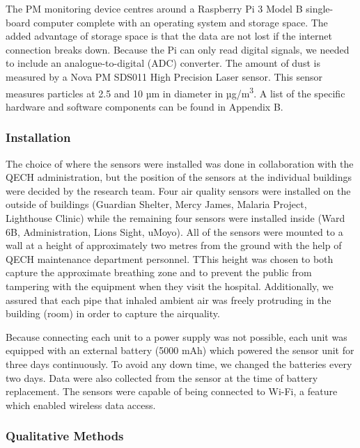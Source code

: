 \documentclass[
  authoryear,
  review,
  3p]{elsarticle}
\begin{document}
The PM monitoring device centres around a Raspberry Pi 3 Model B
single-board computer complete with an operating system and storage
space. The added advantage of storage space is that the data are not
lost if the internet connection breaks down. Because the Pi can only
read digital signals, we needed to include an analogue-to-digital (ADC)
converter. The amount of dust is measured by a Nova PM SDS011 High
Precision Laser sensor. This sensor measures particles at 2.5 and 10 µm
in diameter in µg/m\textsuperscript{3}. A list of the specific hardware
and software components can be found in Appendix B.

\hypertarget{installation}{%
\subsubsection{Installation}\label{installation}}

The choice of where the sensors were installed was done in collaboration
with the QECH administration, but the position of the sensors at the
individual buildings were decided by the research team. Four air quality
sensors were installed on the outside of buildings (Guardian Shelter,
Mercy James, Malaria Project, Lighthouse Clinic) while the remaining
four sensors were installed inside (Ward 6B, Administration, Lions
Sight, uMoyo). All of the sensors were mounted to a wall at a height of
approximately two metres from the ground with the help of QECH
maintenance department personnel. TThis height was chosen to both
capture the approximate breathing zone and to prevent the public from
tampering with the equipment when they visit the hospital. Additionally,
we assured that each pipe that inhaled ambient air was freely protruding
in the building (room) in order to capture the airquality.

Because connecting each unit to a power supply was not possible, each
unit was equipped with an external battery (5000 mAh) which powered the
sensor unit for three days continuously. To avoid any down time, we
changed the batteries every two days. Data were also collected from the
sensor at the time of battery replacement. The sensors were capable of
being connected to Wi-Fi, a feature which enabled wireless data access.

\hypertarget{qualitative-methods}{%
\subsubsection{Qualitative Methods}\label{qualitative-methods}}
\end{document}
